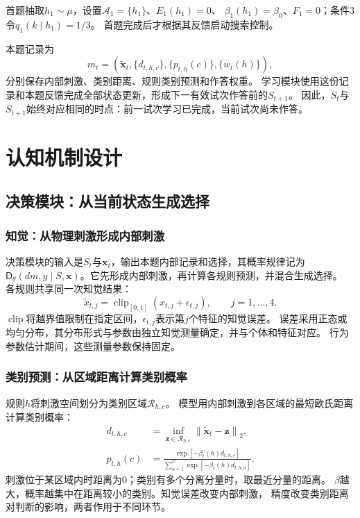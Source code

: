 \documentclass[11pt,a4paper]{article}
\numberwithin{equation}{section}
\newcommand{\norm}[1]{\left\lVert#1\right\rVert}
\newcommand{\clip}{\operatorname{clip}}
\newcommand{\A}{\mathcal{A}}
\newcommand{\Dd}{\mathsf{D}}
\begin{document}
首题抽取$h_1\sim\mu$，设置$\A_1=\{h_1\}$、$E_1(h_1)=0$、
$\beta_1(h_1)=\beta_0$、$F_1=0$；条件3令$q_1(k\mid h_1)=1/3$。
首题完成后才根据其反馈启动搜索控制。

本题记录为
\begin{equation}
m_t=\left(\widetilde{\bm x}_t,\{d_{t,h,c}\},\{p_{t,h}(c)\},\{w_t(h)\}\right),
\end{equation}
分别保存内部刺激、类别距离、规则类别预测和作答权重。
学习模块使用这份记录和本题反馈完成全部状态更新，形成下一有效试次作答前的$S_{t+1}$。
因此，$S_t$与$S_{t+1}$始终对应相同的时点：前一试次学习已完成，当前试次尚未作答。

\section{认知机制设计}
\label{sec:mechanisms}

\subsection{决策模块：从当前状态生成选择}
\label{sec:decision}

\subsubsection{知觉：从物理刺激形成内部刺激}
决策模块的输入是$S_t$与$\bm x_t$，输出本题内部记录和选择，其概率规律记为
$\Dd_\theta(dm,y\mid S,\bm x)$。它先形成内部刺激，再计算各规则预测，并混合生成选择。
各规则共享同一次知觉结果：
\begin{equation}
\widetilde x_{t,j}=\clip_{[0,1]}(x_{t,j}+\epsilon_{t,j}),\qquad j=1,\ldots,4.
\label{eq:perception}
\end{equation}
$\clip$将越界值限制在指定区间，$\epsilon_{t,j}$表示第$j$个特征的知觉误差。
误差采用正态或均匀分布，其分布形式与参数由独立知觉测量确定，并与个体和特征对应。
行为参数估计期间，这些测量参数保持固定。

\subsubsection{类别预测：从区域距离计算类别概率}
规则$h$将刺激空间划分为类别区域$\mathcal R_{h,c}$。
模型用内部刺激到各区域的最短欧氏距离计算类别概率：
\begin{align}
d_{t,h,c}&=\inf_{\bm z\in\mathcal R_{h,c}}\norm{\widetilde{\bm x}_t-\bm z}_2,\\
p_{t,h}(c)&=\frac{\exp[-\beta_t(h)d_{t,h,c}]}
{\sum_{a=1}^C\exp[-\beta_t(h)d_{t,h,a}]}.
\label{eq:category}
\end{align}
刺激位于某区域内时距离为0；类别有多个分离分量时，取最近分量的距离。
$\beta$越大，概率越集中在距离较小的类别。知觉误差改变内部刺激，
精度改变类别距离对判断的影响，两者作用于不同环节。
\end{document}
